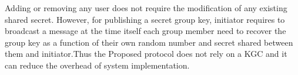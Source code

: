 \documentclass[10pt,a4paper,journal]{IEEEtran}
\begin{document}

\hspace{2em} Adding or removing any user does not require the modification of any existing shared secret. However, for publishing a secret group key, initiator requires to broadcast a message at the time itself each group member need to recover the group key as a function of their own random number and secret shared between them and initiator.Thus the Proposed protocol does not rely on a KGC and it can reduce the overhead of system implementation.



\end{document}

